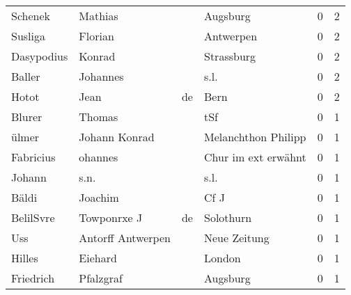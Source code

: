 \begin{center}
\begin{tiny}
\begin{longtabu}{llllrr}
                  Schenek &                            Mathias &             &                                    Augsburg &          0 &         2 \\
                  Susliga &                            Florian &             &                                   Antwerpen &          0 &         2 \\
               Dasypodius &                             Konrad &             &                                  Strassburg &          0 &         2 \\
                   Baller &                           Johannes &             &                                        s.l. &          0 &         2 \\
                    Hotot &                               Jean &          de &                                        Bern &          0 &         2 \\
                   Blurer &                             Thomas &             &                                         tSf &          0 &         1 \\
                    ülmer &                      Johann Konrad &             &                         Melanchthon Philipp &          0 &         1 \\
                Fabricius &                            ohannes &             &                         Chur im ext erwähnt &          0 &         1 \\
                   Johann &                               s.n. &             &                                        s.l. &          0 &         1 \\
                    Bäldi &                            Joachim &             &                                        Cf J &          0 &         1 \\
                BelilSvre &                        Towponrxe J &          de &                                   Solothurn &          0 &         1 \\
                      Uss &                  Antorff Antwerpen &             &                                Neue Zeitung &          0 &         1 \\
                   Hilles &                            Eiehard &             &                                      London &          0 &         1 \\
                Friedrich &                          Pfalzgraf &             &                                    Augsburg &          0 &         1 \\

\end{longtabu}
\end{tiny}
\end{center}
